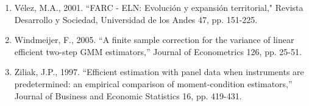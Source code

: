 \begin{enumerate}
\item V\'{e}lez, M.A., 2001. ``FARC - ELN: Evoluci\'{o}n y expansi\'{o}n territorial," Revista Desarrollo y Sociedad, Universidad de los Andes 47, pp. 151-225.

\item Windmeijer, F., 2005. ``A finite sample correction for the variance of linear efficient two-step GMM estimators,'' Journal of Econometrics 126, pp. 25-51.

\item  Ziliak, J.P., 1997. ``Efficient estimation with panel data when instruments are predetermined: an empirical comparison of moment-condition estimators,'' Journal of Business and Economic Statistics 16, pp. 419-431.

\end{enumerate}





